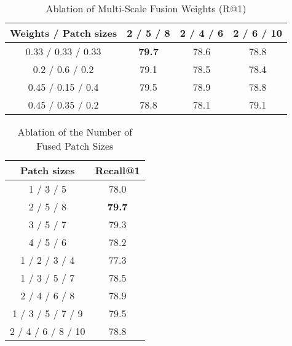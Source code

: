 \begin{table}[t]
  \renewcommand{\arraystretch}{1.2}
  \centering
  \caption{Ablation of Multi-Scale Fusion Weights (R@1)}
  \vspace{0.1cm}
      \footnotesize
    \begin{tabular}{ c|c|c|c } 
Weights / Patch sizes & 2 / 5 / 8 & 2 / 4 / 6 & 2 / 6 / 10 \\
    \hline
     0.33 / 0.33 / 0.33 & \textbf{79.7} & 78.6 &78.8  \\ 
     0.2 / 0.6 / 0.2 & 79.1  & 78.5  & 78.4 \\ 
     0.45 / 0.15 / 0.4 & 79.5  & 78.9  & 78.8  \\ 
     0.45 / 0.35 / 0.2 & 78.8  & 78.1  & 79.1  \\ 
\end{tabular}
    \label{tab:fusionweights}
\end{table}

\begin{table}[t]
  \renewcommand{\arraystretch}{1.2}
  \centering
  \caption{Ablation of the Number of Fused Patch Sizes}
  \vspace{0.1cm}
      \footnotesize
    \begin{tabular}{ c|c } 
Patch sizes & Recall@1 \\
    \hline
     1 / 3 / 5 & 78.0 \\
     2 / 5 / 8 & \textbf{79.7}  \\ 
     3 / 5 / 7 & 79.3  \\ 
     4 / 5 / 6 & 78.2  \\ 
    \hline
     1 / 2 / 3 / 4 & 77.3  \\
     1 / 3 / 5 / 7 & 78.5  \\
     2 / 4 / 6 / 8 & 78.9  \\
    \hline
     1 / 3 / 5 / 7 / 9 & 79.5 \\
     2 / 4 / 6 / 8 / 10 & 78.8 \\
\end{tabular}
\label{tab:fusionnumber}
\end{table}

